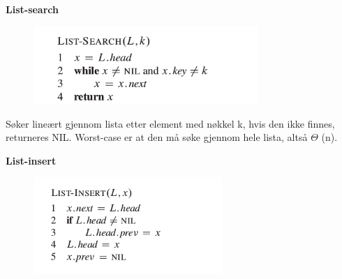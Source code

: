 \documentclass[12pt]{report}
\begin{document}

\par


\vspace{\baselineskip}
\begin{multicols}{2}
\textbf{List-search}\par




\begin{figure}[H]
	\begin{Center}
		\includegraphics[width=3.34in,height=1.16in]{./media/image15.png}
	\end{Center}
\end{figure}



\par

 \par

Søker lineært gjennom lista etter element med nøkkel k, hvis den ikke finnes, returneres NIL. Worst-case er at den må søke gjennom hele lista, altså $ \Theta $ (n). \par


\vspace{\baselineskip}
\textbf{List-insert}\par




\begin{figure}[H]
	\begin{Center}
		\includegraphics[width=2.82in,height=1.43in]{./media/image16.png}
	\end{Center}
\end{figure}



\end{multicols}
\end{document}
